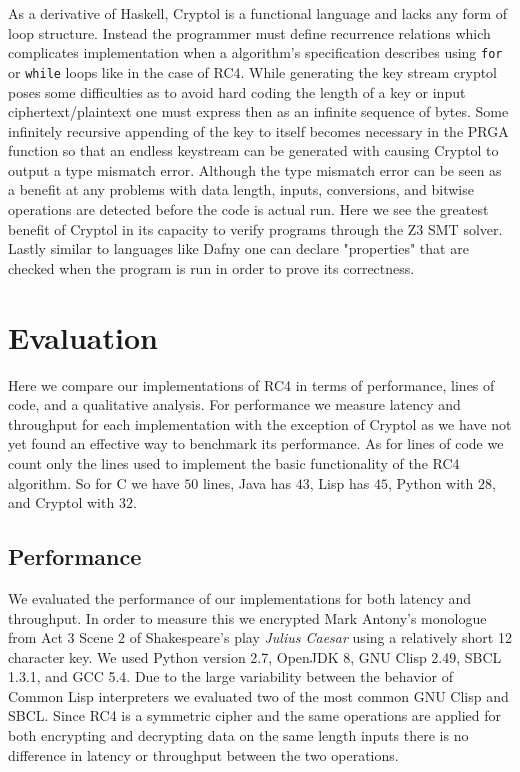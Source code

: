 As a derivative of Haskell, Cryptol is a functional language and lacks any form of loop structure. Instead the 
programmer must define recurrence relations which complicates implementation when a algorithm's specification describes using \texttt{for} or \texttt{while} loops like in the 
case of RC4. While generating the key stream cryptol poses some difficulties as to avoid hard coding the length of a key or input ciphertext/plaintext one must express then as 
an infinite sequence of bytes. Some infinitely recursive appending of the key to itself becomes necessary in the PRGA function so that an endless keystream can be generated with 
causing Cryptol to output a type mismatch error. Although the type mismatch error can be seen as a benefit at any problems with data length, inputs, conversions, and bitwise operations 
are detected before the code is actual run. Here we see the greatest benefit of Cryptol in its capacity to verify programs through the Z3 SMT solver. Lastly similar to languages 
like Dafny one can declare "properties" that are checked when the program is run in order to prove its correctness.

\section{Evaluation}
Here we compare our implementations of RC4 in terms of performance, lines of code, and a qualitative analysis. For performance we measure latency and throughput for 
each implementation with the exception of Cryptol as we have not yet found an effective way to benchmark its performance. As for lines of code we count only the lines used to implement the basic functionality of the RC4 algorithm. So for C we have $50$ lines, Java has $43$, Lisp has $45$, Python with $28$, and Cryptol with $32$.

\subsection{Performance}

We evaluated the performance of our implementations for both latency and throughput. In order to measure this we encrypted Mark Antony's 
monologue from Act $3$ Scene $2$ of Shakespeare's play \emph{Julius Caesar} using a relatively short 12 character key. We used Python version 2.7, OpenJDK 8, GNU Clisp 2.49, SBCL 1.3.1, and GCC 5.4. Due to the large variability between the behavior of Common Lisp interpreters we evaluated 
two of the most common GNU Clisp and SBCL. Since RC4 is a symmetric cipher and the same operations are applied for both encrypting and decrypting data on the same length inputs there is no difference in
latency or throughput between the two operations.

